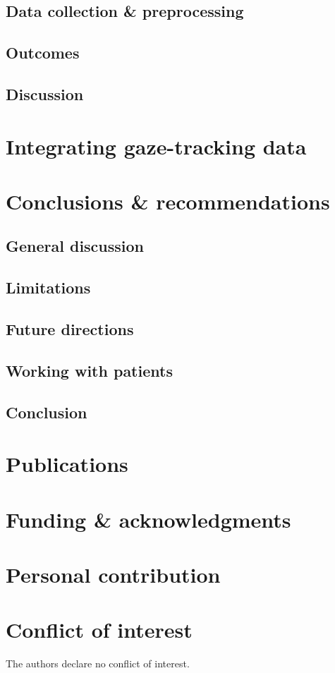 \section{Data collection \& preprocessing}
\section{Outcomes}
\section{Discussion}

\chapter{Integrating gaze-tracking data}

\chapter{Conclusions \& recommendations}
\section{General discussion}
\section{Limitations}
\section{Future directions}
\section{Working with patients}
\section{Conclusion}



\appendix
\backmatter
\chapter{Publications}
\chapter{Funding \& acknowledgments}
\lipsum[1]
\chapter{Personal contribution}
\lipsum[2]
\chapter{Conflict of interest}
The authors declare no conflict of interest.


